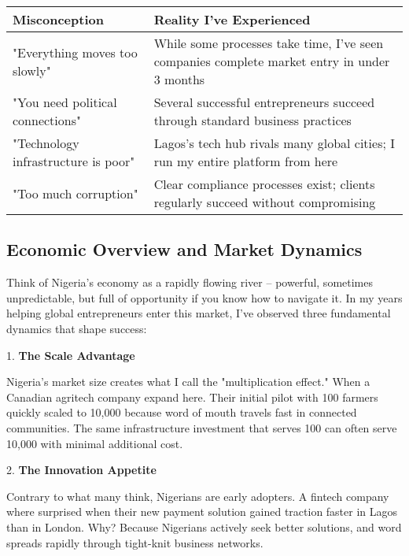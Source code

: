\begin{center}
\begin{tabularx}{\textwidth}{>{\raggedright\arraybackslash}X >{\raggedright\arraybackslash}X}
    \toprule
    \textbf{Misconception} & \textbf{Reality I've Experienced} \\
    \midrule
    "Everything moves too slowly" & While some processes take time, I've seen companies complete market entry in under 3 months \\
    "You need political connections" & Several successful entrepreneurs succeed through standard business practices \\
    "Technology infrastructure is poor" & Lagos's tech hub rivals many global cities; I run my entire platform from here \\
    "Too much corruption" & Clear compliance processes exist; clients regularly succeed without compromising \\
    \bottomrule
\end{tabularx}
\end{center}

\subsection{Economic Overview and Market Dynamics}


Think of Nigeria's economy as a rapidly flowing river – powerful, sometimes unpredictable, but full of opportunity if you know how to navigate it. In my years helping global entrepreneurs enter this market, I've observed three fundamental dynamics that shape success:

1. \textbf{The Scale Advantage}

   Nigeria's market size creates what I call the "multiplication effect." When a Canadian agritech company expand here. Their initial pilot with 100 farmers quickly scaled to 10,000 because word of mouth travels fast in connected communities. The same infrastructure investment that serves 100 can often serve 10,000 with minimal additional cost.

2. \textbf{The Innovation Appetite}

   Contrary to what many think, Nigerians are early adopters. A fintech company where surprised when their new payment solution gained traction faster in Lagos than in London. Why? Because Nigerians actively seek better solutions, and word spreads rapidly through tight-knit business networks.

